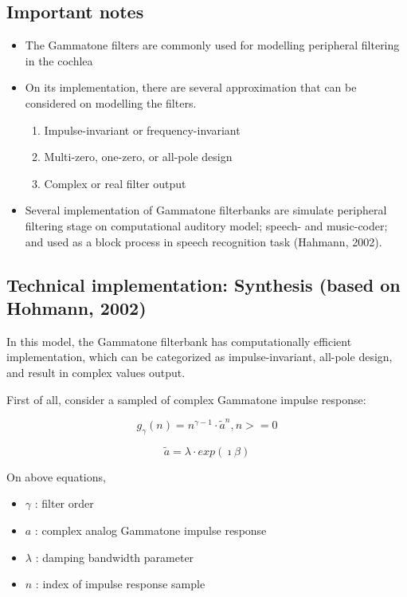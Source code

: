 
\subsection{Important notes}
\begin{itemize}
	\item The Gammatone filters are commonly used for modelling peripheral filtering in the cochlea
	
	\item On its implementation, there are several approximation that can be considered on modelling the filters.
	
	\begin{enumerate}
		\item Impulse-invariant or frequency-invariant
		\item Multi-zero, one-zero, or all-pole design
		\item Complex or real filter output
	\end{enumerate}
	
	\item Several implementation of Gammatone filterbanks are simulate peripheral filtering stage on computational auditory model; speech- and music-coder; and used as a block process in speech recognition task (Hahmann, 2002).
	
\end{itemize}

\subsection{Technical implementation: Synthesis (based on Hohmann, 2002)}
In this model, the Gammatone filterbank has computationally efficient implementation, which can be categorized as impulse-invariant, all-pole design, and result in complex values output. 

First of all, consider a sampled of complex Gammatone impulse response:

\begin{equation}
	g_\gamma (n) = n^{\gamma - 1} \cdot \tilde{a}^n , n>=0
\end{equation}

\begin{equation}
	\tilde{a} = \lambda \cdot exp(\imath\beta)
\end{equation}

On above equations, 
\begin{itemize}
	\item $\gamma$ : filter order
	\item \(a\) : complex analog Gammatone impulse response
	\item $\lambda$ : damping bandwidth parameter
	\item \(n\) : index of impulse response sample
\end{itemize}

